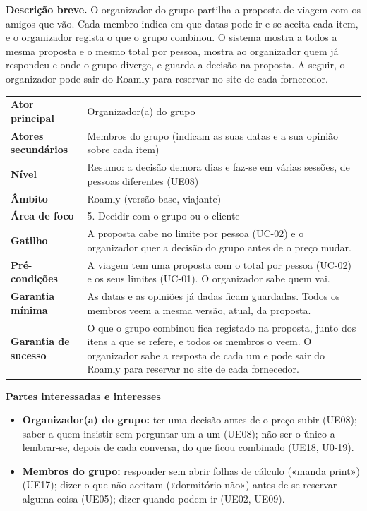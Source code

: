 \documentclass[11pt,a4paper]{article}
\newcommand{\reg}[1]{{\footnotesize\textcolor{pendente}{(#1)}}}
\newenvironment{usecase}[2]{%
  \par\medskip\noindent{\large\bfseries\color{roamly}#1: #2}\par\smallskip\small\noindent\ignorespaces}{\par\medskip}
\newcommand{\ucField}[2]{\textbf{#1} & #2 \\}
\begin{document}
\begin{usecase}{UC-04}{Levar o grupo a decidir sobre a proposta}
\textbf{Descrição breve.} O organizador do grupo partilha a proposta de viagem com os amigos que vão. Cada membro indica em que datas pode ir e se aceita cada item, e o organizador regista o que o grupo combinou. O sistema mostra a todos a mesma proposta e o mesmo total por pessoa, mostra ao organizador quem já respondeu e onde o grupo diverge, e guarda a decisão na proposta. A seguir, o organizador pode sair do Roamly para reservar no site de cada fornecedor.\par\smallskip
\begin{tabularx}{\textwidth}{@{}>{\raggedright\arraybackslash}p{3.4cm}L@{}}
\toprule
\ucField{Ator principal}{Organizador(a) do grupo}
\ucField{Atores secundários}{Membros do grupo (indicam as suas datas e a sua opinião sobre cada item)}
\ucField{Nível}{Resumo: a decisão demora dias e faz-se em várias sessões, de pessoas diferentes \reg{UE08}}
\ucField{Âmbito}{Roamly (versão base, viajante)}
\ucField{Área de foco}{5. Decidir com o grupo ou o cliente}
\ucField{Gatilho}{A proposta cabe no limite por pessoa (UC-02) e o organizador quer a decisão do grupo antes de o preço mudar.}
\ucField{Pré-condições}{A viagem tem uma proposta com o total por pessoa (UC-02) e os seus limites (UC-01). O organizador sabe quem vai.}
\ucField{Garantia mínima}{As datas e as opiniões já dadas ficam guardadas. Todos os membros veem a mesma versão, atual, da proposta.}
\ucField{Garantia de sucesso}{O que o grupo combinou fica registado na proposta, junto dos itens a que se refere, e todos os membros o veem. O organizador sabe a resposta de cada um e pode sair do Roamly para reservar no site de cada fornecedor.}
\bottomrule
\end{tabularx}

\medskip
\textbf{Partes interessadas e interesses}
\begin{itemize}
  \item \textbf{Organizador(a) do grupo:} ter uma decisão antes de o preço subir \reg{UE08}; saber a quem insistir sem perguntar um a um \reg{UE08}; não ser o único a lembrar-se, depois de cada conversa, do que ficou combinado \reg{UE18, U0-19}.
  \item \textbf{Membros do grupo:} responder sem abrir folhas de cálculo («manda print») \reg{UE17}; dizer o que não aceitam («dormitório não») antes de se reservar alguma coisa \reg{UE05}; dizer quando podem ir \reg{UE02, UE09}.
\end{itemize}


\end{usecase}
\end{document}
